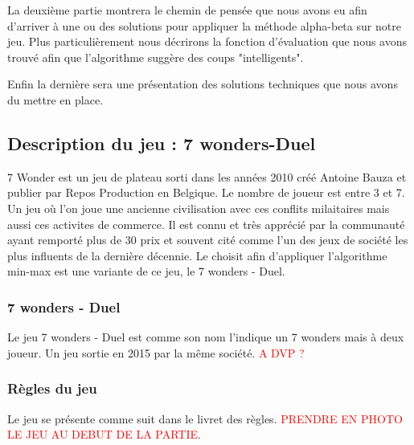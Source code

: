 \documentclass[a4paper, 12pt, french]{article}
\begin{document}
	La deuxième partie montrera le chemin de pensée que nous avons eu afin d'arriver à une ou des solutions pour
	appliquer la méthode alpha-beta sur notre jeu. Plus particulièrement nous décrirons la fonction d'évaluation
	que nous avons trouvé afin que l'algorithme suggère des coups "intelligents".

	Enfin la dernière sera une présentation des solutions techniques que nous avons du mettre en place.

	\subsection{Description du jeu : 7 wonders-Duel}
	7 Wonder est un jeu de plateau sorti dans les années 2010 créé Antoine Bauza et publier par Repos Production en
	Belgique. Le nombre de joueur est entre 3 et 7. Un jeu où l'on joue une ancienne
	civilisation avec ces conflits milaitaires mais aussi ces activites de commerce. Il est connu et très apprécié
	par la communauté ayant remporté plus de 30 prix et souvent cité comme l'un des jeux de société les plus influents
	de la dernière décennie\cite{wiki_7_wonder}.
	Le choisit afin d'appliquer l'algorithme min-max est une variante de ce jeu, le 7 wonders - Duel.

	\subsubsection{7 wonders - Duel}
	Le jeu 7 wonders - Duel est comme son nom l'indique un 7 wonders mais à deux joueur. Un jeu sortie en 2015
	par la même société. \textcolor{red}{A DVP ?}

	\subsubsection{Règles du jeu}
	Le jeu se présente comme suit dans le livret des règles\cite{regle_7_wonder_duel}.
	\textcolor{red}{PRENDRE EN PHOTO LE JEU AU DEBUT DE LA PARTIE}.
\end{document}

